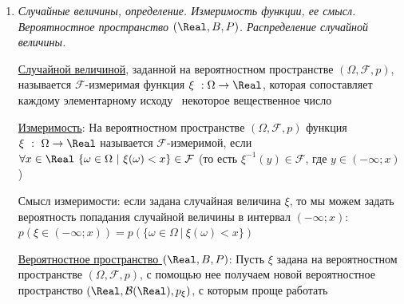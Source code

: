 \documentclass[12pt]{article}
\begin{document}
\begin{enumerate}
    \hyperlink{poissonschema}{Схема Пуассона}: вероятность числа успеха при одном испытании $p_n$ зависит от числа испытаний $n$, причем таким образом, что $n p_n \approx \lambda = const$, 
    $\lambda$ - интенсивность появления редких событий в единицу времени в потоке испытаний. Применимо при $p$ близком к 0 или к 1.

    \hyperlink{poissonformula}{Формула Пуассона}: \Ths Пусть $n \to \infty, p_n \to 0$ таким образом, что $n p_n \to \lambda = const > 0$.
    Тогда вероятность $k$ успехов при $n$ испытаниях: $P_n(k) = C^k_n p_n^k (1 - p_n)^{n - k} \underset{n \to \infty}{\rightarrow} = \frac{\lambda^k}{k!} e^{-\lambda}$

    \hyperlink{errorinpoissonformula}{Оценка погрешности}: \Ths Пусть $v_n$ - число успехов при $n$ испытаниях в схеме Бернулли

    $p$ - вероятность успеха при одном испытании, $\lambda = np$, $A \subset \{0, 1, \dots, n\}$ - произвольное подмножество чисел

    Тогда $|P_n (v_n \in A) - \sum_{k \in A} \frac{\lambda^k}{k!} e^{-\lambda}| \leq \min (p, np^2) = \min (p, p\lambda)$

    \item \textit{Случайные величины, определение. Измеримость функции, ее смысл. Вероятностное пространство $(\Real, B, P)$. Распределение случайной величины.}

    \hyperlink{randomvaluedefinition}{Случайной величиной}, заданной на вероятностном пространстве $(\Omega, \mathcal{F}, p)$, называется
    $\mathcal{F}$-измеримая функция $\xi \ : \Omega \to \Real$, которая сопоставляет каждому элементарному исходу \
    некоторое вещественное число

    \hyperlink{measurabilityoffunction}{Измеримость}: На вероятностном пространстве $(\Omega, \mathcal{F}, p)$ функция $\xi \ : \ \Omega \to \Real$ называется
    $\mathcal{F}$-измеримой, если $\forall x \in \Real \ \{\omega \in \Omega \ | \ \xi(\omega) < x\} \in \mathcal{F}$
    (то есть $\xi^{-1}(y) \in \mathcal{F}$, где $y \in (-\infty; x)$)

    Смысл измеримости: если задана случайная величина $\xi$, то мы можем задать вероятность попадания случайной
    величины в интервал $(-\infty; x)$: $p(\xi \in (-\infty; x)) = p(\{\omega \in \Omega \ | \ \xi(\omega) < x\})$

    \hyperlink{probabilityspacerbp}{Вероятностное пространство $(\Real, B, P)$}: Пусть $\xi$ задана на вероятностном пространстве $(\Omega, \mathcal{F}, p)$, с помощью нее получаем новой вероятностное
    пространство $(\Real, \mathcal{B}(\Real), p_\xi)$, с которым проще работать


\end{enumerate}
\end{document}
